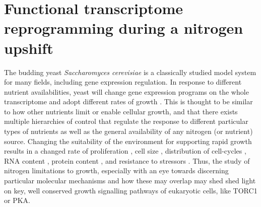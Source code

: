 \section{Functional transcriptome reprogramming during a
nitrogen upshift}

The budding yeast \textit{Saccharomyces cerevisiae}
is a
classically studied model system for many fields, including gene
expression regulation. In response to different nutrient
availabilities, yeast will change gene expression programs on the
whole transcriptome and adopt different rates of growth
\parencite{cooper1982nitrogen}. 
This is thought to be similar to how other nutrients limit or enable
cellular growth, and that there exists multiple hierarchies of 
control that regulate the response to different particular 
types of nutrients as well as the
general availability of any nitrogen (or nutrient) source.
Changing the suitability of the environment for supporting rapid
growth results in a changed rate of proliferation \parencite{}, 
cell size \parencite{}, distribution of cell-cycles \parencite{},
RNA content \parencite{}, protein content \parencite{},
and resistance to stressors \parencite{}.
Thus, the study of nitrogen limitations to growth, especially with 
an eye towards discerning particular molecular mechanisms 
\parencite{olivieria2015,tate2017,torc12015hallpaper,lst4} and how these may overlap
\parencite{conway} may shed shed light on key, well conserved growth 
signalling pathways of eukaryotic cells, like TORC1 or PKA.

